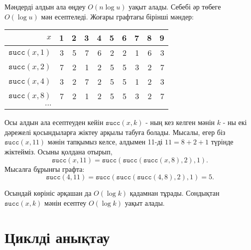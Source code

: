Мәндерді алдын ала өңдеу $O(n \log u)$ уақыт алады.
Себебі әр төбеге $O(\log u)$ мән есептеледі.
Жоғары графтағы бірінші мәндер:

\begin{center}
\begin{tabular}{r|rrrrrrrrr}
$x$ & 1 & 2 & 3 & 4 & 5 & 6 & 7 & 8 & 9 \\
\hline
$\texttt{succ}(x,1)$ & 3 & 5 & 7 & 6 & 2 & 2 & 1 & 6 & 3 \\
$\texttt{succ}(x,2)$ & 7 & 2 & 1 & 2 & 5 & 5 & 3 & 2 & 7 \\
$\texttt{succ}(x,4)$ & 3 & 2 & 7 & 2 & 5 & 5 & 1 & 2 & 3 \\
$\texttt{succ}(x,8)$ & 7 & 2 & 1 & 2 & 5 & 5 & 3 & 2 & 7 \\
$\cdots$ \\
\end{tabular}
\end{center}

Осы алдын ала есептеуден кейін $\texttt{succ}(x,k)$ - ның кез келген мәнін $k$ - ны екі дәрежелі қосындыларға жіктеу арқылы табуға болады. Мысалы, егер біз 
$\texttt{succ}(x,11)$ мәнін тапқымыз келсе, алдымен 11-ді $11=8+2+1$ түрінде жіктейміз.
Осыны қолдана отырып,
\[\texttt{succ}(x,11)=\texttt{succ}(\texttt{succ}(\texttt{succ}(x,8),2),1).\]
Мысалға бұрынғы графта: 
\[\texttt{succ}(4,11)=\texttt{succ}(\texttt{succ}(\texttt{succ}(4,8),2),1)=5.\]

Осындай көрініс әрқашан да $O(\log k)$ қадамнан тұрады.
Сондықтан $\texttt{succ}(x,k)$ мәнін есептеу $O(\log k)$
уақыт алады.

\section{Циклді анықтау}

